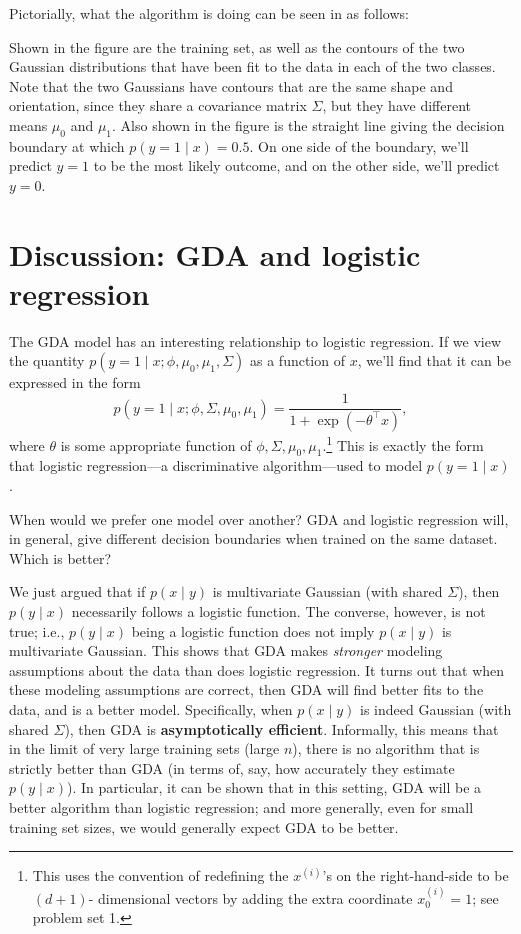 Pictorially, what the algorithm is doing can be seen in as follows:

Shown in the figure are the training set, as well as the contours of the
two Gaussian distributions that have been fit to the data in each of the
two classes. Note that the two Gaussians have contours that are the same
shape and orientation, since they share a covariance matrix $\Sigma$, but they have
different means $\mu_0$ and $\mu_1$. Also shown in the figure is the straight line
giving the decision boundary at which $p(y = 1 \mid x) = 0.5$. On one side of
the boundary, we'll predict $y = 1$ to be the most likely outcome, and on the
other side, we'll predict $y = 0$.

\section{Discussion: GDA and logistic regression}
The GDA model has an interesting relationship to logistic regression. If we
view the quantity $p(y = 1 \mid x;\phi,\mu_0 ,\mu_1 ,\Sigma)$ as a function of $x$, we'll find that it
can be expressed in the form
\begin{equation}
    p(y = 1 \mid x;\phi,\Sigma,\mu_0 ,\mu_1 ) = \frac{1}{1 + \exp(-\theta^\top x)},
\end{equation}
where $\theta$ is some appropriate function of $\phi,\Sigma,\mu_0 ,\mu_1$.\footnote{
This uses the convention of redefining the $x^{(i)}$'s on the right-hand-side to be $(d + 1)$-
dimensional vectors by adding the extra coordinate $x^{(i)}_0 = 1$; see problem set 1.}
This is exactly the form that logistic regression---a discriminative algorithm---used to model
$p(y = 1 \mid x)$.

When would we prefer one model over another? GDA and logistic regression
will, in general, give different decision boundaries when trained on the
same dataset. Which is better?

We just argued that if $p(x \mid y)$ is multivariate Gaussian (with shared $\Sigma$), %
then $p(y \mid x)$ necessarily follows a logistic function. The converse, however,
is not true; i.e., $p(y \mid x)$ being a logistic function does not imply $p(x \mid y)$ is
multivariate Gaussian. This shows that GDA makes \textit{stronger} modeling assumptions
about the data than does logistic regression. It turns out that
when these modeling assumptions are correct, then GDA will find better fits
to the data, and is a better model. Specifically, when $p(x \mid y)$ is indeed Gaussian
(with shared $\Sigma$), then GDA is \textbf{asymptotically efficient}. Informally,
this means that in the limit of very large training sets (large $n$), there is no
algorithm that is strictly better than GDA (in terms of, say, how accurately
they estimate $p(y \mid x)$). In particular, it can be shown that in this setting,
GDA will be a better algorithm than logistic regression; and more generally,
even for small training set sizes, we would generally expect GDA to be better. %

